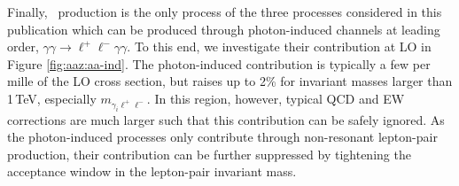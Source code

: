 Finally, \aaz\ production is the only process of the three processes 
considered in this publication which can be produced through 
photon-induced channels at leading order, 
$\gamma\gamma\to\ell^+\ell^-\gamma\gamma$. 
To this end, we investigate their contribution at LO in 
Figure \ref{fig:aaz:aa-ind}. 
The photon-induced contribution is typically a few per mille of the 
LO cross section, but raises up to 2\% for invariant masses larger 
than 1\,TeV, especially $m_{\gamma_i\ell^+\ell^-}$. 
In this region, however, typical QCD and EW corrections are much larger 
such that this contribution can be safely ignored. 
As the photon-induced processes only contribute through non-resonant 
lepton-pair production, their contribution can be further suppressed 
by tightening the acceptance window in the lepton-pair invariant mass.


